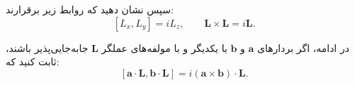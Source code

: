 \documentclass[a4paper,16pt]{article}
\begin{document}
	سپس نشان دهید که روابط زیر برقرارند:
	\[
	[L_x,L_y]=iL_z,
	\qquad
	\mathbf{L}\times\mathbf{L}=i\mathbf{L}.
	\]
	
	در ادامه، اگر بردارهای \(\mathbf{a}\) و \(\mathbf{b}\) با یکدیگر
	و با مولفه‌های عملگر \(\mathbf{L}\) جابه‌جایی‌پذیر باشند،
	ثابت کنید که:
	\[
	[\mathbf{a}\cdot\mathbf{L},
	\mathbf{b}\cdot\mathbf{L}]
	=
	i(\mathbf{a}\times\mathbf{b})\cdot\mathbf{L}.
	\]
	
\end{document}
